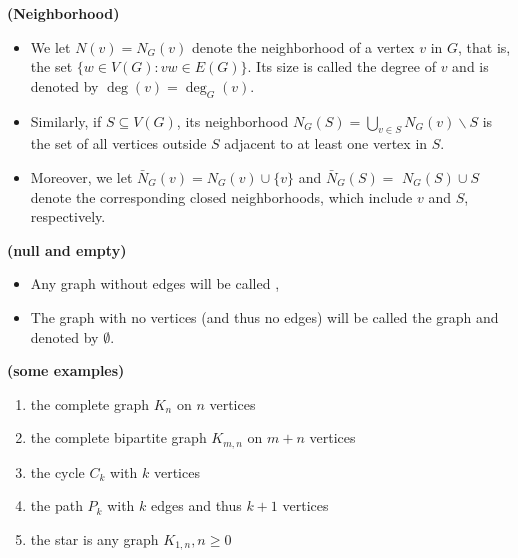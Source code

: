 \documentclass{article}
\newcommand{\bfs}[1]{\textbf{({#1}) }}
\begin{document}
\begin{defa}{\bfs{Neighborhood}}
\begin{itemize}
    \item  We let $N(v)=N_{G}(v)$ denote the neighborhood of a vertex $v$ in $G$, that
is, the set $\{w \in V(G): v w \in E(G)\} .$ Its size is called the degree of $v$ and is denoted by $\operatorname{deg}(v)=\operatorname{deg}_{G}(v)$. 
\item  Similarly, if $S \subseteq V(G)$, its neighborhood $N_{G}(S)=\bigcup_{v \in S} N_{G}(v) \backslash S$ is the set of all vertices outside $S$ adjacent to at least one vertex in $S .$
\item Moreover, we let $\bar{N}_{G}(v)=N_{G}(v) \cup\{v\}$ and $\bar{N}_{G}(S)=$ $N_{G}(S) \cup S$ denote the corresponding closed neighborhoods, which include $v$ and $S$, respectively.
\end{itemize}
\end{defa}

\begin{defa}{\bfs{null and empty}}
 \begin{itemize}
     \item Any graph without edges will be called ,
     \item The graph with no vertices (and thus no edges) will be called the  graph and denoted by $\emptyset .$
 \end{itemize} 
\end{defa}
\begin{exma}{\bfs{some examples}}

\begin{enumerate}
    \item the complete graph $K_{n}$ on $n$ vertices
    \item the complete bipartite graph $K_{m, n}$ on $m+n$ vertices
    \item the cycle $C_{k}$ with $k$ vertices
    \item the path $P_{k}$ with $k$ edges and thus $k+1$ vertices
    \item the star is any graph $K_{1, n}, n \geq 0$
\end{enumerate}

\end{exma}
\end{document}
